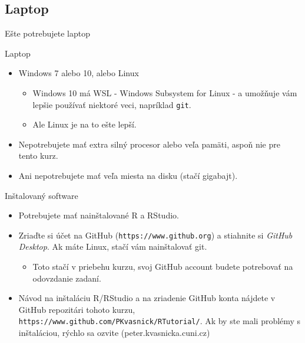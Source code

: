\subsection{Laptop}
\begin{frame}{Ešte potrebujete laptop}
	\begin{block}{Laptop}
		\begin{itemize}
			\item Windows 7 alebo 10, alebo Linux
			\begin{itemize}
				\item Windows 10 má WSL - Windows Subsystem for Linux - a umožňuje vám lepšie používať niektoré veci, napríklad \texttt{git}.
				\item Ale Linux je na to ešte lepší.
			\end{itemize}
			\item Nepotrebujete mať extra silný procesor alebo veľa pamäti, aspoň nie pre tento kurz.
			\item Ani nepotrebujete mať veľa miesta na disku (stačí gigabajt).
		\end{itemize}
	\end{block}
	\begin{block}{Inštalovaný software}
		\begin{itemize}
			\item Potrebujete mať nainštalované R a RStudio.
			\item Zriaďte si účet na GitHub (\texttt{https://www.github.org}) a stiahnite si \emph{GitHub Desktop}. Ak máte Linux, stačí vám nainštalovať git. 
			\begin{itemize}
				\item Toto stačí v priebehu kurzu, svoj GitHub account budete potrebovať na odovzdanie zadaní.
			\end{itemize}
			\item Návod na inštaláciu R/RStudio a na zriadenie GitHub konta nájdete v GitHub repozitári tohoto kurzu, \texttt{https://www.github.com/PKvasnick/RTutorial/}. Ak by ste mali problémy s inštaláciou, rýchlo sa ozvite (peter.kvasnicka\@mff.cuni.cz)
		\end{itemize}
	\end{block}
\end{frame}

